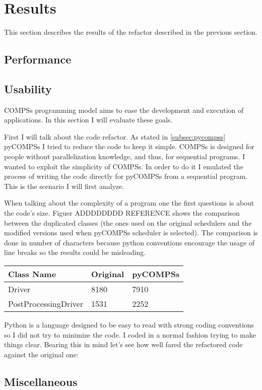 \chapter{Results}


This section describes the results of the refactor described in the previous section. 
\section{Performance}



\section{Usability}

COMPSs programming model aims to ease the development and execution of applications. In this section I will evaluate these goals.

First I will talk about the code refactor. As stated in \ref{subsec:pycompss} pyCOMPSs I tried to reduce the code to keep it simple. COMPSs is designed for people without parallelization knowledge, and thus, for sequential programs. I wanted to exploit the simplicity of COMPSs. In order to do it I emulated the process of writing the code directly for pyCOMPSs from a sequential program. This is the scenario I will first analyze.

When talking about the complexity of a program one the first questions is about the code's size. Figuer ADDDDDDDD REFERENCE shows the comparison between the duplicated classes (the ones used on the original schedulers and the modified versions used when pyCOMPSs scheduler is selected). The comparison is done in number of characters because python conventions encourage the usage of line breaks so the results could be misleading.


\begin{center}
	\begin{tabular}{| R{3cm} | C{3cm} | C{3cm} |}
		\hline
		Class Name & Original & pyCOMPSs \\ 
		\hline
		\hline
		Driver & 8180  &  7910 \\
		PostProcessingDriver & 1531 & 2252 \\
		
		\hline
	\end{tabular}
\end{center}


Python is a language designed to be easy to read with strong coding conventions so I did not try to minimize the code. I coded in a normal fashion trying to make things clear. Bearing this in mind let's see how well fared the refactored code against the original one:





\section{Miscellaneous}